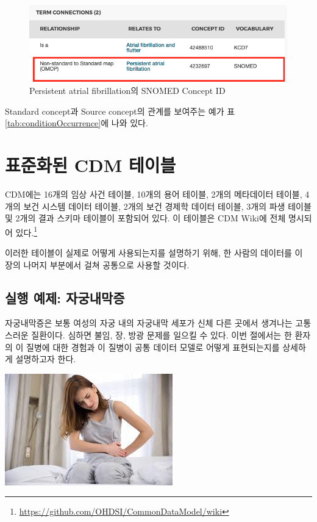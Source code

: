 \documentclass[10.5pt]{book}
\let\rmarkdownfootnote\footnote%
\def\footnote{\protect\rmarkdownfootnote}
\theoremstyle{definition}
\theoremstyle{definition}
\theoremstyle{definition}
\theoremstyle{remark}
\begin{document}
\begin{figure}

{\centering \includegraphics[width=1\linewidth]{images/CommonDataModel/AFKCDMap} 

}

\caption{Persistent atrial fibrillation의 SNOMED Concept ID}\label{fig:pulmTubMap}
\end{figure}

Standard concept과 Source concept의 관계를 보여주는 예가 표
\ref{tab:conditionOccurrence}에 나와 있다.

\section{표준화된 CDM 테이블}\label{-cdm-}


CDM에는 16개의 임상 사건 테이블, 10개의 용어 테이블, 2개의 메타데이터
테이블, 4개의 보건 시스템 데이터 테이블, 2개의 보건 경제학 데이터
테이블, 3개의 파생 테이블 및 2개의 결과 스키마 테이블이 포함되어 있다.
이 테이블은 CDM Wiki에 전체 명시되어 있다.\footnote{\url{https://github.com/OHDSI/CommonDataModel/wiki}}

이러한 테이블이 실제로 어떻게 사용되는지를 설명하기 위해, 한 사람의
데이터를 이 장의 나머지 부분에서 걸쳐 공통으로 사용할 것이다.

\subsection{실행 예제: 자궁내막증}\label{--}

자궁내막증은 보통 여성의 자궁 내의 자궁내막 세포가 신체 다른 곳에서
생겨나는 고통스러운 질환이다. 심하면 불임, 장, 방광 문제를 일으킬 수
있다. 이번 절에서는 한 환자의 이 질병에 대한 경험과 이 질병이 공통
데이터 모델로 어떻게 표현되는지를 상세하게 설명하고자 한다.

\begin{center}\includegraphics[width=0.5\linewidth]{images/CommonDataModel/Lauren} \end{center}
\end{document}
